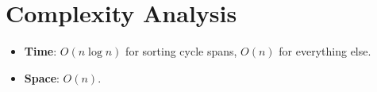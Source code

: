 \documentclass[11pt,a4paper]{article}
\begin{document}
\section{Complexity Analysis}

\begin{itemize}
  \item \textbf{Time}: $O(n \log n)$ for sorting cycle spans, $O(n)$ for everything else.
  \item \textbf{Space}: $O(n)$.
\end{itemize}
\end{document}
